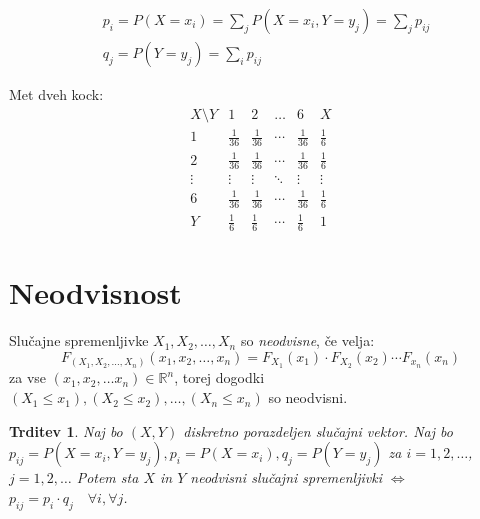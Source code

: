 \documentclass[12pt]{book}
\def\n{\noindent}
\theoremstyle{definition}
\theoremstyle{plain}
\theoremstyle{plain}
\newtheorem{trditev}{Trditev}
\theoremstyle{plain}
\theoremstyle{remark}
\begin{document}
$$
\begin{aligned}
    &p_i=P\left(X=x_i\right)=\sum_j P\left(X=x_i, Y=y_j \right)=\sum_j p_{ij} \\
    &q_j=P\left(Y=y_j\right)=\sum_i p_{ij}
\end{aligned}
$$

\begin{zgled}
    Met dveh kock: 
    $$
    \begin{array}{c|cccc|c}
        X \setminus Y & 1 & 2 & \ldots & 6 & X \\
        \hline 1 & \frac{1}{36} & \frac{1}{36} & \cdots & \frac{1}{36} & \frac{1}{6}\\
        2 & \frac{1}{36} & \frac{1}{36} & \cdots & \frac{1}{36} & \frac{1}{6}\\
        \vdots & \vdots & \vdots & \ddots & \vdots & \vdots \\
        6 & \frac{1}{36} & \frac{1}{36} & \cdots & \frac{1}{36} & \frac{1}{6} \\
        \hline Y & \frac{1}{6} & \frac{1}{6} & \cdots & \frac{1}{6} & 1
    \end{array}
    $$
\end{zgled}

\section{Neodvisnost}

\n Slučajne spremenljivke $X_1, X_2, \ldots, X_n$ so \emph{neodvisne}, če velja: 
$$
F_{\left(X_1, X_2, \ldots, X_n\right)}\left(x_1, x_2, \ldots, x_n\right)=F_{X_1}\left(x_1\right) \cdot F_{X_2}\left(x_2\right) \cdots F_{x_n}\left(x_n\right)
$$
za vse $\left(x_1, x_2, \ldots x_n\right) \in \mathbb{R}^n$, torej dogodki $\left(X_1 \leq x_1\right),\left(X_2 \leq x_2\right), \ldots,\left(X_n \leq x_n\right)$ so neodvisni.

\begin{trditev}
    Naj bo $(X,Y)$ diskretno porazdeljen slučajni vektor. Naj bo $p_{i j}=P\left(X=x_i, Y=y_j\right), p_i=P\left(X=x_i\right), q_j=P\left(Y=y_j\right)$ za $i=1, 2, \ldots$, $j=1, 2, \ldots$ Potem sta $X$ in $Y$ neodvisni slučajni spremenljivki $\iff$ $p_{i j}=p_i \cdot q_j \quad \forall i, \forall j$. 
\end{trditev}
\end{document}
